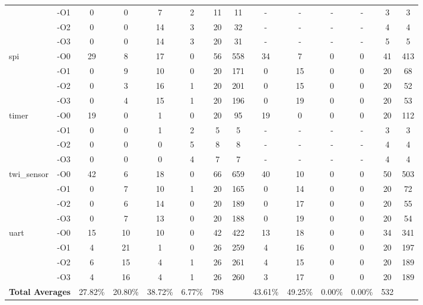 \begin{tabular}{@{}ll|cccccc|cccccc@{}}
    & -O1 &  0 &  0 &  7 &  2 & 11 &  11 &  - &  - &  - &  - &  3 &   3  \\
    & -O2 &  0 &  0 & 14 &  3 & 20 &  32 &  - &  - &  - &  - &  4 &   4  \\
    & -O3 &  0 &  0 & 14 &  3 & 20 &  31 &  - &  - &  - &  - &  5 &   5  \\ \midrule
\multirow{4}{*}{spi}
    & -O0 & 29 &  8 & 17 &  0 & 56 & 558 & 34 &  7 &  0 &  0 & 41 & 413  \\
    & -O1 &  0 &  9 & 10 &  0 & 20 & 171 &  0 & 15 &  0 &  0 & 20 &  68  \\
    & -O2 &  0 &  3 & 16 &  1 & 20 & 201 &  0 & 15 &  0 &  0 & 20 &  52  \\
    & -O3 &  0 &  4 & 15 &  1 & 20 & 196 &  0 & 19 &  0 &  0 & 20 &  53  \\ \midrule
\multirow{4}{*}{timer}
    & -O0 & 19 &  0 &  1 &  0 & 20 &  95 & 19 &  0 &  0 &  0 & 20 & 112  \\
    & -O1 &  0 &  0 &  1 &  2 &  5 &   5 &  - &  - &  - &  - &  3 &   3  \\
    & -O2 &  0 &  0 &  0 &  5 &  8 &   8 &  - &  - &  - &  - &  4 &   4  \\
    & -O3 &  0 &  0 &  0 &  4 &  7 &   7 &  - &  - &  - &  - &  4 &   4  \\ \midrule
\multirow{4}{*}{twi\_sensor}
    & -O0 & 42 &  6 & 18 &  0 & 66 & 659 & 40 & 10 &  0 &  0 & 50 & 503  \\
    & -O1 &  0 &  7 & 10 &  1 & 20 & 165 &  0 & 14 &  0 &  0 & 20 &  72  \\
    & -O2 &  0 &  6 & 14 &  0 & 20 & 189 &  0 & 17 &  0 &  0 & 20 &  55  \\
    & -O3 &  0 &  7 & 13 &  0 & 20 & 188 &  0 & 19 &  0 &  0 & 20 &  54  \\ \midrule
\multirow{4}{*}{uart}
    & -O0 & 15 & 10 & 10 &  0 & 42 & 422 & 13 & 18 &  0 &  0 & 34 & 341  \\
    & -O1 &  4 & 21 &  1 &  0 & 26 & 259 &  4 & 16 &  0 &  0 & 20 & 197  \\
    & -O2 &  6 & 15 &  4 &  1 & 26 & 261 &  4 & 15 &  0 &  0 & 20 & 189  \\
    & -O3 &  4 & 16 &  4 &  1 & 26 & 260 &  3 & 17 &  0 &  0 & 20 & 189  \\ \midrule
\multicolumn{2}{l}{\textbf{Total Averages}}
          & 27.82\% & 20.80\% & 38.72\% &  6.77\% & 798 && 43.61\% & 49.25\% &  0.00\% &  0.00\% & 532 &  \\ \bottomrule
\end{tabular}
